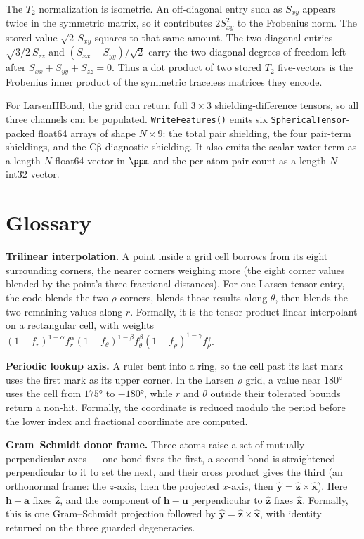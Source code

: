 \documentclass[11pt]{article}
\newcommand{\code}[1]{\texttt{#1}}
\begin{document}
The \(T_2\) normalization is isometric. An off-diagonal entry such as
\(S_{xy}\) appears twice in the symmetric matrix, so it contributes
\(2S_{xy}^2\) to the Frobenius norm. The stored value
\(\sqrt2\,S_{xy}\) squares to that same amount. The two diagonal entries
\(\sqrt{3/2}\,S_{zz}\) and \((S_{xx}-S_{yy})/\sqrt2\) carry the two diagonal
degrees of freedom left after \(S_{xx}+S_{yy}+S_{zz}=0\). Thus a dot product
of two stored \(T_2\) five-vectors is the Frobenius inner product of the
symmetric traceless matrices they encode.

For LarsenHBond, the grid can return full \(3\times3\)
shielding-difference tensors, so all three channels can be populated.
\code{WriteFeatures()} emits six \code{SphericalTensor}-packed float64 arrays
of shape \(N\times9\): the total pair shielding, the four pair-term
shieldings, and the \(\mathrm{C\beta}\) diagnostic shielding. It also emits
the scalar water term as a length-\(N\) float64 vector in \(\si{\ppm}\) and
the per-atom pair count as a length-\(N\) int32 vector.

\section{Glossary}

\textbf{Trilinear interpolation.} A point inside a grid cell borrows from its
eight surrounding corners, the nearer corners weighing more (the eight corner
values blended by the point's three fractional distances). For one Larsen tensor
entry, the code blends the two \(\rho\) corners, blends
those results along \(\theta\), then blends the two remaining values along
\(r\). Formally, it is the tensor-product linear interpolant on a rectangular
cell, with weights
\((1-f_r)^{1-\alpha}f_r^\alpha
 (1-f_\theta)^{1-\beta}f_\theta^\beta
 (1-f_\rho)^{1-\gamma}f_\rho^\gamma\).

\textbf{Periodic lookup axis.} A ruler bent into a ring, so the cell past its
last mark uses the first mark as its upper corner. In the Larsen
\(\rho\) grid, a value near \(\ang{180}\) uses the cell from \(\ang{175}\) to
\(-\ang{180}\), while \(r\) and \(\theta\) outside their tolerated bounds
return a non-hit. Formally, the coordinate is reduced modulo the period before
the lower index and fractional coordinate are computed.

\textbf{Gram--Schmidt donor frame.} Three atoms raise a set of mutually
perpendicular axes --- one bond fixes the first, a second bond is straightened
perpendicular to it to set the next, and their cross product gives the third (an
orthonormal frame: the \(z\)-axis, then the projected \(x\)-axis, then
\(\hat{\bm y}=\hat{\bm z}\times\hat{\bm x}\)). Here \(\bm h-\bm a\) fixes
\(\hat{\bm z}\), and the component of
\(\bm h-\bm u\) perpendicular to \(\hat{\bm z}\) fixes \(\hat{\bm x}\).
Formally, this is one Gram--Schmidt projection followed by
\(\hat{\bm y}=\hat{\bm z}\times\hat{\bm x}\), with identity returned on the
three guarded degeneracies.
\end{document}
